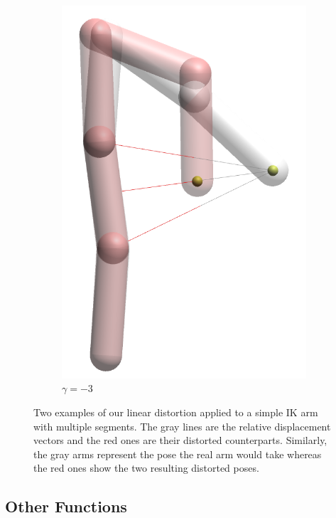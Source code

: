 \begin{figure}
\begin{subfigure}[b]{0.2\textwidth}
        \includegraphics[width=\textwidth]{Figures/simple_distortion_-3.png}
        \caption{$\gamma = -3$}
    \end{subfigure}
    \caption{Two examples of our linear distortion applied to a simple IK arm with multiple segments. The gray lines are the relative displacement vectors and the red ones are their distorted counterparts. Similarly, the gray arms represent the pose the real arm would take whereas the red ones show the two resulting distorted poses.}\label{fig:armExamples}
\end{figure}

\subsection*{Other Functions}

